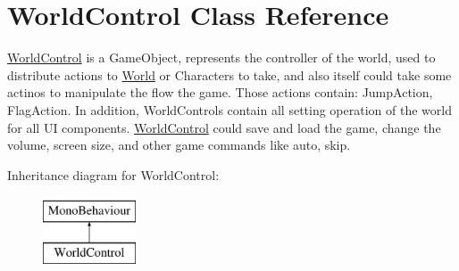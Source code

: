 \hypertarget{class_world_control}{}\section{World\+Control Class Reference}
\label{class_world_control}


\hyperlink{class_world_control}{World\+Control} is a Game\+Object, represents the controller of the world, used to distribute actions to \hyperlink{class_world}{World} or Characters to take, and also itself could take some actinos to manipulate the flow the game. Those actions contain\+: Jump\+Action, Flag\+Action. In addition, World\+Controls contain all setting operation of the world for all UI components. \hyperlink{class_world_control}{World\+Control} could save and load the game, change the volume, screen size, and other game commands like auto, skip.  


Inheritance diagram for World\+Control\+:\begin{figure}[H]
\begin{center}
\leavevmode
\includegraphics[height=2.000000cm]{class_world_control}
\end{center}
\end{figure}
